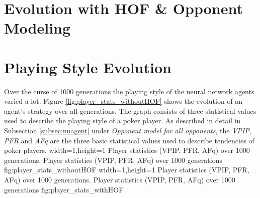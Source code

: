 \section{Evolution with HOF \& Opponent Modeling}

\section{Playing Style Evolution }
Over the curse of 1000 generations the playing style of the neural network agents varied a lot. Figure \ref{fig:player_stats_withoutHOF} shows the evolution of an agent's strategy over all generations. The graph consists of three statistical values used to describe the playing style of a poker player. As described in detail in Subsection \ref{subsec:nnagent} under \textit{Opponent model for all opponents}, the \textit{VPIP}, \textit{PFR} and \textit{AFq} are the three basic statistical values used to  describe tendencies of poker players. 
  {width=1\textwidth,height=1\textheight}%
  {Player statistics (VPIP, PFR, AFq) over 1000 generations.}%
  {Player statistics (VPIP, PFR, AFq) over 1000 generations}%
  {fig:player_stats_withoutHOF}%
  {width=1\textwidth,height=1\textheight}%
  {Player statistics (VPIP, PFR, AFq) over 1000 generations.}%
  {Player statistics (VPIP, PFR, AFq) over 1000 generations}%
  {fig:player_stats_withHOF}%
  

